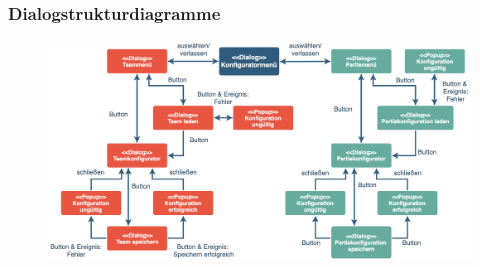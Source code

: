 \subsubsection{Dialogstrukturdiagramme}    
\begin{figure}[H]
    \centering
    \includegraphics[width=\textwidth]{../Meilenstein03/images/dialogstruktur_konfigurator}
\end{figure}




